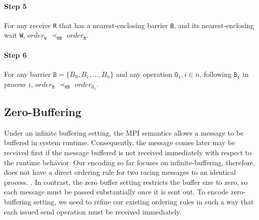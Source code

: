 \paragraph*{Step 5} For any receive \texttt{R} that has a nearest-enclosing barrier \texttt{B}, and its nearest-enclosing wait \texttt{W}, $\mathit{order}_\mathtt{W}$
$\prec_\mathtt{HB}$ $\mathit{order}_\mathtt{B}$.

\paragraph*{Step 6} For any barrier $\mathtt{B} = \{B_0, B_1, ..., B_n\}$ and any operation $\mathtt{O_i}, i\in n$, following $\mathtt{B_i}$ in process $i$, $\mathit{order}_\mathtt{B}$
$\prec_\mathtt{HB}$ $\mathit{order}_\mathtt{O_i}$.






\subsection{Zero-Buffering}

Under an infinite buffering setting, the MPI semantics allows a message to be buffered in system runtime. Consequently, the message comes later may be received first if the message buffered is not received immediately with respect to the runtime behavior. Our encoding so far focuses on infinite-buffering, therefore, does not have a direct ordering rule for two racing messages to an identical process. 
. In contrast, the zero buffer setting restricts the buffer size to zero, so each message must be passed substantially once it is sent out. To encode zero-buffering setting, we need to refine our existing ordering rules in such a way that each issued send operation must be received immediately. 



